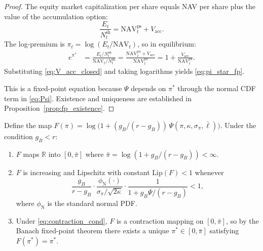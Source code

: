 \begin{proof}
The equity market capitalization per share equals NAV per share plus the
value of the accumulation option:
\begin{equation}\label{eq:equity_decomp_endo}
  \frac{E_t}{N_t^{\mathrm{sh}}}
  = \mathrm{NAV}_t^{\mathrm{ps}} + V_{\mathrm{acc}}.
\end{equation}
The log-premium is $\pi_t = \log(E_t / \mathrm{NAV}_t)$, so in equilibrium:
\begin{align}
  e^{\pi^*} &= \frac{E_t / N_t^{\mathrm{sh}}}{\mathrm{NAV}_t / N_t^{\mathrm{sh}}}
  = \frac{\mathrm{NAV}_t^{\mathrm{ps}} + V_{\mathrm{acc}}}
         {\mathrm{NAV}_t^{\mathrm{ps}}}
  = 1 + \frac{V_{\mathrm{acc}}}{\mathrm{NAV}_t^{\mathrm{ps}}}.
  \label{eq:pi_star_derivation}
\end{align}
Substituting \eqref{eq:V_acc_closed} and taking logarithms yields
\eqref{eq:pi_star_fp}.

This is a fixed-point equation because $\Psi$ depends on $\pi^*$ through
the normal CDF term in \eqref{eq:Psi}.  Existence and uniqueness are
established in Proposition~\ref{prop:fp_existence}.
\end{proof}

\begin{proposition}%
\label{prop:fp_existence}
Define the map
$F(\pi) = \log\!\bigl(1 + (g_B/(r-g_B))\,\Psi(\pi, \kappa, \sigma_\pi,
\bar\ell)\bigr)$.  Under the condition $g_B < r$:
\begin{enumerate}
  \item $F$ maps $\mathbb{R}$ into $[0, \bar\pi]$ where
    $\bar\pi = \log(1 + g_B/(r-g_B)) < \infty$.
  \item $F$ is increasing and Lipschitz with constant
    $\mathrm{Lip}(F) < 1$ whenever
    \begin{equation}\label{eq:contraction_cond}
      \frac{g_B}{r - g_B} \cdot
      \frac{\phi_{\mathrm{N}}(\cdot)}{\sigma_\pi / \sqrt{2\kappa}}
      \cdot \frac{1}{1 + g_B \Psi / (r - g_B)} < 1,
    \end{equation}
    where $\phi_{\mathrm{N}}$ is the standard normal PDF.
  \item Under \eqref{eq:contraction_cond}, $F$ is a contraction mapping on
    $[0, \bar\pi]$, so by the Banach fixed-point theorem there exists a
    unique $\pi^* \in [0, \bar\pi]$ satisfying $F(\pi^*) = \pi^*$.
\end{enumerate}
\end{proposition}


